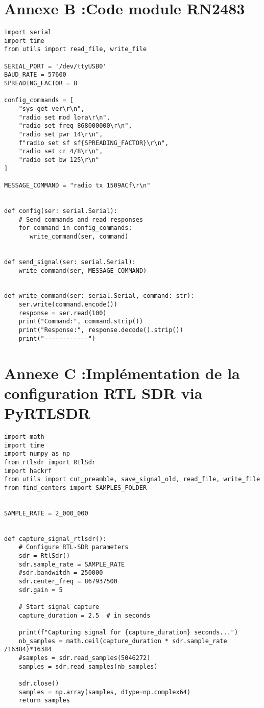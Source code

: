 \newpage

\section{Annexe B :Code module RN2483}\label{codern}

\begin{lstlisting}[style=pythonstyle, caption={Configuration module RN2483}, label={lst:python}]
import serial
import time
from utils import read_file, write_file

SERIAL_PORT = '/dev/ttyUSB0'
BAUD_RATE = 57600
SPREADING_FACTOR = 8

config_commands = [
    "sys get ver\r\n",
    "radio set mod lora\r\n",
    "radio set freq 868000000\r\n",
    "radio set pwr 14\r\n",
    f"radio set sf sf{SPREADING_FACTOR}\r\n",
    "radio set cr 4/8\r\n",
    "radio set bw 125\r\n"
]

MESSAGE_COMMAND = "radio tx 1509ACf\r\n"


def config(ser: serial.Serial):
    # Send commands and read responses
    for command in config_commands:
       write_command(ser, command)


def send_signal(ser: serial.Serial):
    write_command(ser, MESSAGE_COMMAND)


def write_command(ser: serial.Serial, command: str):
    ser.write(command.encode())
    response = ser.read(100)
    print("Command:", command.strip())
    print("Response:", response.decode().strip())
    print("------------")
\end{lstlisting}

\newpage

\section{Annexe C :Implémentation de la configuration RTL SDR via PyRTLSDR}\label{antenne}

\begin{lstlisting}[style=pythonstyle, caption={Configuration RTL SDR}, label={lst:python}]
import math
import time
import numpy as np
from rtlsdr import RtlSdr
import hackrf
from utils import cut_preamble, save_signal_old, read_file, write_file
from find_centers import SAMPLES_FOLDER


SAMPLE_RATE = 2_000_000


def capture_signal_rtlsdr():
    # Configure RTL-SDR parameters
    sdr = RtlSdr()
    sdr.sample_rate = SAMPLE_RATE
    #sdr.bandwitdh = 250000
    sdr.center_freq = 867937500
    sdr.gain = 5

    # Start signal capture
    capture_duration = 2.5  # in seconds

    print(f"Capturing signal for {capture_duration} seconds...")
    nb_samples = math.ceil(capture_duration * sdr.sample_rate /16384)*16384
    #samples = sdr.read_samples(5046272)
    samples = sdr.read_samples(nb_samples)

    sdr.close()
    samples = np.array(samples, dtype=np.complex64)
    return samples
\end{lstlisting}

